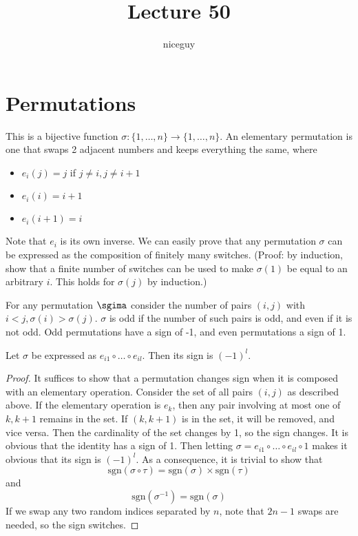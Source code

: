 \documentclass[12pt]{article}
\title{Lecture 50}
\author{niceguy}
\begin{document}
\maketitle

\section{Permutations}

This is a bijective function $\sigma:\{1,\dots,n\} \rightarrow \{1,\dots,n\}$. An elementary permutation is one that swaps 2 adjacent numbers and keeps everything the same, where

\begin{itemize}
    \item $e_i(j) = j$ if $j \ne i, j \ne i + 1$
    \item $e_i(i) = i+1$
    \item $e_i(i+1) = i$
\end{itemize}

Note that $e_i$ is its own inverse. We can easily prove that any permutation $\sigma$ can be expressed as the composition of finitely many switches. (Proof: by induction, show that a finite number of switches can be used to make $\sigma(1)$ be equal to an arbitrary $i$. This holds for $\sigma(j)$ by induction.)

\begin{defn}
    For any permutation $\sgima$ consider the number of pairs $(i,j)$ with $i < j, \sigma(i) > \sigma(j)$. $\sigma$ is odd if the number of such pairs is odd, and even if it is not odd. Odd permutations have a sign of -1, and even permutations a sign of 1.
\end{defn}

\begin{prop}
    Let $\sigma$ be expressed as $e_{i1} \circ \dots \circ e_{il}$. Then its sign is $(-1)^l$.
\end{prop}

\begin{proof}
    It suffices to show that a permutation changes sign when it is composed with an elementary operation. Consider the set of all pairs $(i,j)$ as described above. If the elementary operation is $e_k$, then any pair involving at most one of $k, k+1$ remains in the set. If $(k,k+1)$ is in the set, it will be removed, and vice versa. Then the cardinality of the set changes by 1, so the sign changes. It is obvious that the identity has a sign of 1. Then letting $\sigma = e_{i1} \circ \dots \circ e_{il} \circ 1$ makes it obvious that its sign is $(-1)^l$. As a consequence, it is trivial to show that
    $$\text{sgn}(\sigma \circ \tau) = \text{sgn}(\sigma) \times \text{sgn}(\tau)$$
    and
    $$\text{sgn}(\sigma^{-1}) = \text{sgn}(\sigma)$$
    If we swap any two random indices separated by $n$, note that $2n-1$ swaps are needed, so the sign switches.
\end{proof}
\end{document}
